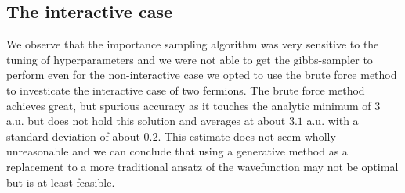 \subsection{The interactive case}

We observe that the importance sampling algorithm was very sensitive to the tuning of hyperparameters and we were not able to get the gibbs-sampler to perform even for the non-interactive case we opted to use the brute force method to investicate the interactive case of two fermions. The brute force method achieves great, but spurious accuracy as it touches the analytic minimum of 3 a.u. but does not hold this solution and averages at about $3.1$ a.u. with a standard deviation of about $0.2$. This estimate does not seem wholly unreasonable  and we can conclude that using a generative method as a replacement to a more traditional ansatz of the wavefunction may not be optimal but is at least feasible. 
